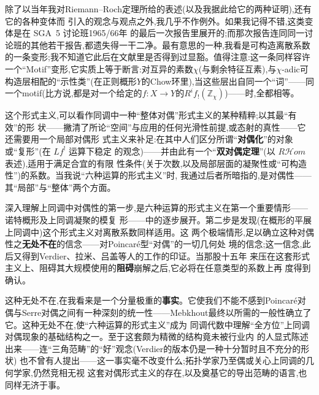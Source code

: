 
除了以当年我对Riemann--Roch定理所给的表述(以及我据此给它的两种证明),还有它的各种变体而
引入的观念与观点之外,我几乎不作例外。如果我记得不错,这类变体是在 SGA~5 讨论班1965/66年
的最后一次报告里展开的;而那次报告连同同一讨论班的其他若干报告,都遗失得一干二净。最有意思的一种,我看是可构造离散系数的一条变形;我不知道它此后在文献里是否得到过显豁。值得注意:这一条同样容许一个“Motif”变形,它实质上等于断言:对互异的素数$\chi$(与剩余特征互素),与$\chi$-adic可构造层相配的“示性类”(在正则概形$Y$的Chow环里),当这些层出自同一个“词”——同一个motif(比方说,都是对一个给定的$f:X\to Y$的$R^if_!(\mathbb{Z}_\chi)$)——时,全都相等。


这个形式主义,可以看作同调中一种“整体对偶”形式主义的某种精粹;以其最“有效”的形
状——撇清了所论“空间”与应用的任何光滑性前提,或态射的真性——它还需要用一个局部对偶形
式主义来补足:在其中人们区分所谓“\textbf{对偶化}”的对象或“复形”\dmark{}(在 $Lf^{!}$ 运算下稳定
的观念)——并由此有一个“\textbf{双对偶定理}”(以 $R\mathcal{H}om$ 表述),适用于满足合宜的有限
性条件(关于次数,以及局部层面的凝聚性或“可构造性”)的系数。当我说“六种运算的形式主义”时,
我通过后者所暗指的,是对偶性——其“局部”与“整体”两个方面。

深入理解上同调中对偶性的第一步,是六种运算的形式主义在第一个重要情形——诺特概形及上同调凝聚的模复
形——中的逐步展开。第二步是发现(在概形的平展上同调中)这个形式主义对离散系数同样适用。这
两个极端情形,足以确立这种对偶性之\textbf{无处不在}的信念——对Poincaré型“对偶”的一切几何处
境的信念;这一信念,此后又得到Verdier、拉米、吕盖等人的工作的印证。当那股十五年
来压在这套形式主义上、阻碍其大规模使用的\textbf{阻碍}崩解之后,它必将在任意类型的系数上再
度得到确认。

这种无处不在,在我看来是一个分量极重的\textbf{事实}。它使我们不能不感到Poincaré对偶与Serre对偶之间有一种深刻的统一性——Mebkhout最终以所需的一般性确立了它。这种无处不在,使“六种运算的形式主义”成为
同调代数中理解“全方位”上同调对偶现象的基础结构之一。至于这套颇为精微的结构竟未被行业内
的人显式陈述出来——连“三角范畴”的“好”观念(Verdier的版本仍是一种十分暂时且不充分的形状)
也不曾有人提出——这一事实毫不改变什么;拓扑学家乃至偶或关心上同调的几何学家,仍然竞相无视
这套对偶形式主义的存在,以及奠基它的导出范畴的语言,也同样无济于事。

